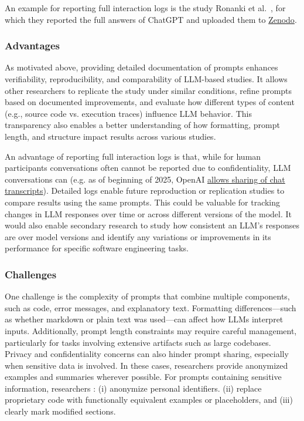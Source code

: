 An example for reporting full interaction logs is the study Ronanki et al.~\cite{ronanki2023investigating}, for which they reported the full answers of ChatGPT and uploaded them to \href{https://zenodo.org/records/8124936}{Zenodo}. 


\subsubsection{Advantages}

As motivated above, providing detailed documentation of prompts enhances verifiability, reproducibility, and comparability of LLM-based studies.
It allows other researchers to replicate the study under similar conditions, refine prompts based on documented improvements, and evaluate how different types of content (e.g., source code vs. execution traces) influence LLM behavior.
This transparency also enables a better understanding of how formatting, prompt length, and structure impact results across various studies.

An advantage of reporting full interaction logs is that, while for human participants conversations often cannot be reported due to confidentiality, LLM conversations can (e.g. as of beginning of 2025, OpenAI \href{https://openai.com/policies/sharing-publication-policy/}{allows sharing of chat transcripts}).
Detailed logs enable future reproduction or replication studies to compare results using the same prompts.
This could be valuable for tracking changes in LLM responses over time or across different versions of the model.
It would also enable secondary research to study how consistent an LLM's responses are over model versions and identify any variations or improvements in its performance for specific software engineering tasks.


\subsubsection{Challenges}

One challenge is the complexity of prompts that combine multiple components, such as code, error messages, and explanatory text.
Formatting differences—such as whether markdown or plain text was used—can affect how LLMs interpret inputs.
Additionally, prompt length constraints may require careful management, particularly for tasks involving extensive artifacts such as large codebases.
Privacy and confidentiality concerns can also hinder prompt sharing, especially when sensitive data is involved. In these cases, researchers \should provide anonymized examples and summaries wherever possible.
For prompts containing sensitive information, researchers \must: (i) anonymize personal identifiers. (ii) replace proprietary code with functionally equivalent examples or placeholders, and (iii) clearly mark modified sections.


